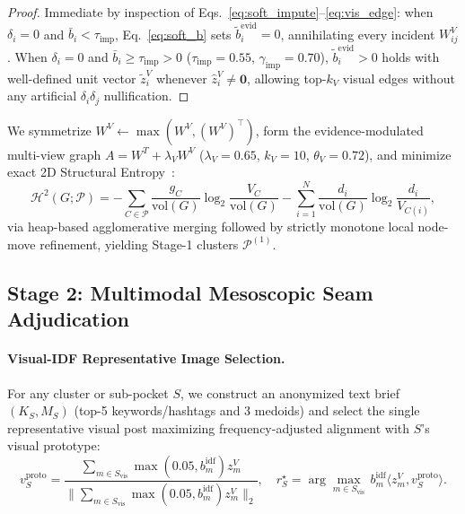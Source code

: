 \begin{proof}
Immediate by inspection of Eqs.~\eqref{eq:soft_impute}--\eqref{eq:vis_edge}: when $\delta_i = 0$ and $\bar{b}_i < \tau_{\text{imp}}$, Eq.~\eqref{eq:soft_b} sets $\tilde{b}_i^{\text{evid}} = 0$, annihilating every incident $W_{ij}^V$. When $\delta_i = 0$ and $\bar{b}_i \ge \tau_{\text{imp}} > 0$ ($\tau_{\text{imp}}=0.55$, $\gamma_{\text{imp}}=0.70$), $\tilde{b}_i^{\text{evid}} > 0$ holds with well-defined unit vector $\tilde{z}_i^V$ whenever $\hat{z}_i^V \neq \mathbf{0}$, allowing top-$k_V$ visual edges without any artificial $\delta_i \delta_j$ nullification.
\end{proof}

We symmetrize $W^V \leftarrow \max(W^V, (W^V)^\top)$, form the evidence-modulated multi-view graph $A = W^T + \lambda_V W^V$ ($\lambda_V=0.65$, $k_V=10$, $\theta_V=0.72$), and minimize exact 2D Structural Entropy~\cite{li2016structural,cao2024hisevent}:
\begin{equation}
\label{eq:2dse}
\mathcal{H}^2(G; \mathcal{P}) = -\sum_{C \in \mathcal{P}} \frac{g_C}{\mathrm{vol}(G)} \log_2 \frac{V_C}{\mathrm{vol}(G)} - \sum_{i=1}^{N} \frac{d_i}{\mathrm{vol}(G)} \log_2 \frac{d_i}{V_{C(i)}},
\end{equation}
via heap-based agglomerative merging followed by strictly monotone local node-move refinement, yielding Stage-1 clusters $\mathcal{P}^{(1)}$.

\subsection{Stage 2: Multimodal Mesoscopic Seam Adjudication}
\label{sec:stage2_method}

\paragraph{Visual-IDF Representative Image Selection.}
For any cluster or sub-pocket $S$, we construct an anonymized text brief $(K_S, M_S)$ (top-5 keywords/hashtags and 3 medoids) and select the single representative visual post maximizing frequency-adjusted alignment with $S$'s visual prototype:
\begin{equation}
\label{eq:rep_img}
v^{\text{proto}}_S = \frac{\sum_{m \in S_{\text{vis}}} \max(0.05, b_m^{\text{idf}}) z_m^V}{\big\|\sum_{m \in S_{\text{vis}}} \max(0.05, b_m^{\text{idf}}) z_m^V\big\|_2}, \quad
r^\star_S = \arg\max_{m \in S_{\text{vis}}} \, b_m^{\text{idf}} \langle z_m^V, v^{\text{proto}}_S \rangle.
\end{equation}

